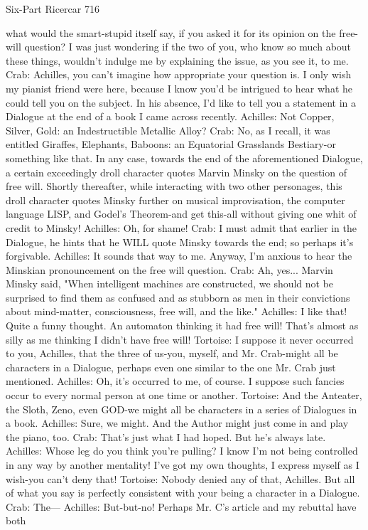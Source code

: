 Six-Part Ricercar                                                                       716

   what would the smart-stupid itself say, if you asked it for its opinion on the free-will
   question? I was just wondering if the two of you, who know so much about these
   things, wouldn't indulge me by explaining the issue, as you see it, to me.
Crab: Achilles, you can't imagine how appropriate your question is. I only wish my
   pianist friend were here, because I know you'd be intrigued to hear what he could tell
   you on the subject. In his absence, I'd like to tell you a statement in a Dialogue at the
   end of a book I came across recently.
Achilles: Not Copper, Silver, Gold: an Indestructible Metallic Alloy?
Crab: No, as I recall, it was entitled Giraffes, Elephants, Baboons: an Equatorial
   Grasslands Bestiary-or something like that. In any case, towards the end of the
   aforementioned Dialogue, a certain exceedingly droll character quotes Marvin
   Minsky on the question of free will. Shortly thereafter, while interacting with two
   other personages, this droll character quotes Minsky further on musical improvisation,
   the computer language LISP, and Godel's Theorem-and get this-all without giving one
   whit of credit to Minsky!
Achilles: Oh, for shame!
Crab: I must admit that earlier in the Dialogue, he hints that he WILL quote Minsky
   towards the end; so perhaps it's forgivable.
Achilles: It sounds that way to me. Anyway, I'm anxious to hear the Minskian
   pronouncement on the free will question.
Crab: Ah, yes... Marvin Minsky said, "When intelligent machines are constructed, we
   should not be surprised to find them as confused and as stubborn as men in their
   convictions about mind-matter, consciousness, free will, and the like."
Achilles: I like that! Quite a funny thought. An automaton thinking it had free will! That's
   almost as silly as me thinking I didn't have free will! Tortoise: I suppose it never
   occurred to you, Achilles, that the three of us-you, myself, and Mr. Crab-might all be
   characters in a Dialogue, perhaps even one similar to the one Mr. Crab just
   mentioned. Achilles: Oh, it's occurred to me, of course. I suppose such fancies occur
   to every normal person at one time or another.
Tortoise: And the Anteater, the Sloth, Zeno, even GOD-we might all be characters in a
   series of Dialogues in a book.
Achilles: Sure, we might. And the Author might just come in and play the piano, too.
Crab: That's just what I had hoped. But he's always late.
Achilles: Whose leg do you think you're pulling? I know I'm not being controlled in any
   way by another mentality! I've got my own thoughts, I express myself as I wish-you
   can't deny that!
Tortoise: Nobody denied any of that, Achilles. But all of what you say is perfectly
   consistent with your being a character in a Dialogue.
Crab: The---
Achilles: But-but-no! Perhaps Mr. C's article and my rebuttal have both




